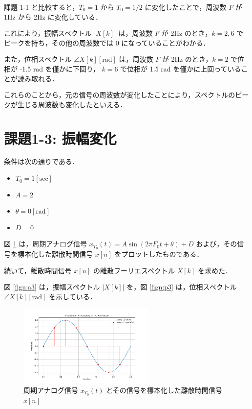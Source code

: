 \documentclass[fleqn, a4paper. 12pt]{jsarticle}
\begin{document}
    課題 1-1 と比較すると，$T_0 = 1$ から $T_0 = 1/2$ に変化したことで，周波数 $F$ が 1Hz から 2Hz に変化している．

    これにより，振幅スペクトル $|X[k]|$ は，周波数 $F$ が 2Hz のとき，$k=2, 6$ でピークを持ち，その他の周波数では 0 になっていることがわかる．

    また，位相スペクトル $\angle X[k][\mathrm{rad}]$ は，周波数 $F$ が 2Hz のとき，$k=2$ で位相が -1.5 rad を僅かに下回り， $k=6$ で位相が 1.5 rad を僅かに上回っていることが読み取れる．

    これらのことから，元の信号の周波数が変化したことにより，スペクトルのピークが生じる周波数も変化したといえる．

  \newpage

  \section*{課題1-3: 振幅変化}
    
  条件は次の通りである．

  \begin{itemize}
    \item $T_0 = 1 [\mathrm{sec}]$
    \item $A = 2$
    \item $\theta = 0 [\mathrm{rad}]$
    \item $D = 0$
  \end{itemize}

  図 \ref{fig:s3} は，周期アナログ信号 $x_{T_0}(t)=A \sin \left(2 \pi F_0 t+\theta\right)+D$ および，その信号を標本化した離散時間信号 $x[n]$ をプロットしたものである．

  続いて，離散時間信号 $x[n]$ の離散フーリエスペクトル $X[k]$ を求めた．

  図 \ref{fign:a3} は，振幅スペクトル $|X[k]|$ を，図 \ref{fign:p3} は，位相スペクトル $\angle X[k][\mathrm{rad}]$ を示している．

  \begin{figure}[!h]
    \centering
    \includegraphics[width=0.6\textwidth]{sampling_experiment_3.png}
    \caption{周期アナログ信号 $x_{T_0}(t)$ とその信号を標本化した離散時間信号 $x[n]$}
    \label{fig:s3}
  \end{figure}
\end{document}
